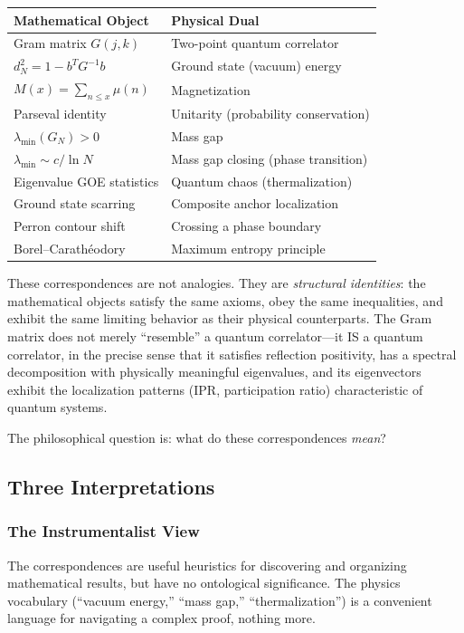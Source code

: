 \begin{center}
\small
\begin{tabular}{@{}ll@{}}
\toprule
\textbf{Mathematical Object} & \textbf{Physical Dual} \\
\midrule
Gram matrix $G(j,k)$ & Two-point quantum correlator \\
$d_N^2 = 1 - b^T G^{-1} b$ & Ground state (vacuum) energy \\
$M(x) = \sum_{n \leq x} \mu(n)$ & Magnetization \\
Parseval identity & Unitarity (probability conservation) \\
$\lambda_{\min}(G_N) > 0$ & Mass gap \\
$\lambda_{\min} \sim c/\ln N$ & Mass gap closing (phase transition) \\
Eigenvalue GOE statistics & Quantum chaos (thermalization) \\
Ground state scarring & Composite anchor localization \\
Perron contour shift & Crossing a phase boundary \\
Borel--Carath\'eodory & Maximum entropy principle \\
\bottomrule
\end{tabular}
\end{center}

\noindent These correspondences are not analogies. They are
\emph{structural identities}: the mathematical objects satisfy the
same axioms, obey the same inequalities, and exhibit the same
limiting behavior as their physical counterparts. The Gram matrix
does not merely ``resemble'' a quantum correlator---it IS a quantum
correlator, in the precise sense that it satisfies reflection
positivity, has a spectral decomposition with physically meaningful
eigenvalues, and its eigenvectors exhibit the localization patterns
(IPR, participation ratio) characteristic of quantum systems.

The philosophical question is: what do these correspondences
\emph{mean}?

\subsection{Three Interpretations}

\subsubsection{The Instrumentalist View}

The correspondences are useful heuristics for discovering and
organizing mathematical results, but have no ontological
significance. The physics vocabulary (``vacuum energy,''
``mass gap,'' ``thermalization'') is a convenient language for
navigating a complex proof, nothing more.

